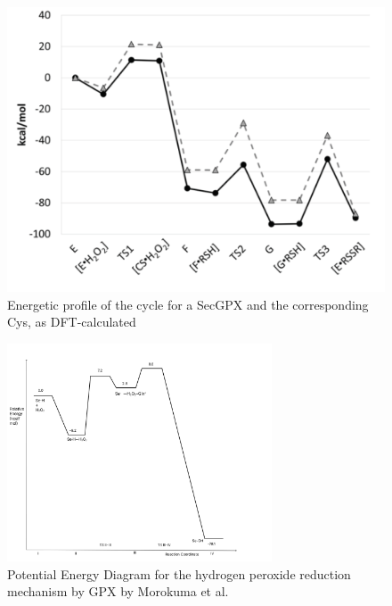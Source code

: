 \documentclass[journal=jacsat,manuscript=article]{achemso}
\begin{document}
{\begin{figure}
\includegraphics[width=0.7\linewidth]{figures/flohe_energyprofile.png} 
\caption{Energetic proﬁle of the cycle for a SecGPX and the corresponding Cys, as DFT-calculated}
\label{fig:figure2}
\end{figure}

\begin{figure}[h]
\includegraphics[width=0.7\textwidth, inner]{figures/morokuma_energy_profile.png}
\caption{Potential Energy Diagram for the hydrogen peroxide reduction mechanism by GPX by Morokuma et al.}
\label{fig:figure3}
\end{figure}

}
\end{document}
